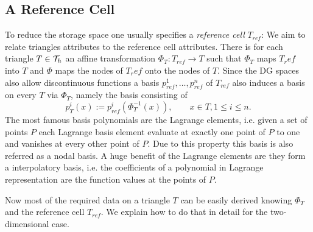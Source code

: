 \subsection{A Reference Cell} \label{subsec: ref cell}
To reduce the storage space one usually specifies a \emph{reference cell} $T_{ref}$: We aim to relate triangles attributes to the reference cell attributes. There is for each triangle $T \in \mathcal{T}_h$ an affine transformation $\Phi_T:T_{ref} \rightarrow T$ such that $\Phi_T$ maps $T_ref$ into $T$ and $\Phi$ maps the nodes of $T_ref$ onto the nodes of $T$.
Since the DG spaces also allow discontinuous functions a basis $p^1_{ref},\dots,p^n_{ref}$ of $T_{ref}$ also induces a basis on every $T$ via $\Phi_T$, namely the basis consisting of 
\[
	p_T^i(x) := p^i_{ref}(\Phi_T^{-1}(x)), \qquad x \in T, 1 \leq i \leq n.
\]
The most famous basis polynomials are the Lagrange elements, i.e. given a set of points $P$ each Lagrange basis element evaluate at exactly one point of $P$ to one and vanishes at every other point of $P$. Due to this property this basis is also referred as a nodal basis. 
A huge benefit of the Lagrange elements are they form a interpolatory basis, i.e. the coefficients of a polynomial in Lagrange representation are the function values at the points of $P$.

Now most of the required data on a triangle $T$ can be easily derived knowing $\Phi_T$ and the reference cell $T_{ref}$. We explain how to do that in detail for the two-dimensional case.

